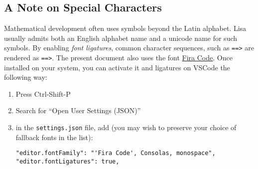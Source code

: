 \subsection*{A Note on Special Characters}
Mathematical development often uses symbols beyond the Latin alphabet. Lisa
usually admits both an English alphabet name and a unicode name for such
symbols. By enabling \emph{font ligatures}, common character sequences, such as
\lstinline|=|\lstinline|=|\lstinline|>| are rendered as \lstinline|==>|. The
present document also uses the font
\href{https://github.com/tonsky/FiraCode}{Fira Code}. Once installed on your
system, you can activate it and ligatures on VSCode the following way:
%
\begin{enumerate}
  \item Press Ctrl-Shift-P
  \item Search for ``Open User Settings (JSON)''
  \item in the \lstinline|settings.json| file, add (you may wish to preserve your choice of fallback fonts in the list):
  \begin{lstlisting}
"editor.fontFamily": "'Fira Code', Consolas, monospace",
"editor.fontLigatures": true,
  \end{lstlisting}
\end{enumerate}

